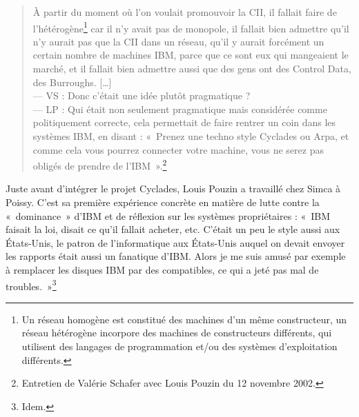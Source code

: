 \documentclass{FramateX}
\begin{document}
\begin{refsection}
\begin{quote}
À partir du moment où l'on voulait promouvoir la CII,
il fallait faire de l'hétérogène\footnote{Un réseau
homogène est constitué des machines d'un même
constructeur, un réseau hétérogène incorpore des machines de
constructeurs différents, qui utilisent des langages de programmation
et/ou des systèmes d'exploitation différents.} car il
n'y avait pas de monopole, il fallait bien admettre
qu'il n'y aurait pas que la CII dans
un réseau, qu'il y aurait forcément un certain nombre
de machines IBM, parce que ce sont eux qui mangeaient le marché, et il
fallait bien admettre aussi que des gens ont des Control Data, des Burroughs. [\ldots] \\
--- VS : Donc c'était une idée plutôt pragmatique ? \\
--- LP : Qui était non seulement pragmatique mais considérée comme politiquement correcte, cela permettait de faire rentrer un coin dans
les systèmes IBM, en disant : «~Prenez une techno style Cyclades ou Arpa, et comme cela vous pourrez connecter votre machine, vous ne serez pas obligés de prendre de
l'IBM~».\footnote{Entretien de Valérie Schafer avec
Louis Pouzin du 12 novembre 2002.}
\end{quote}

Juste avant d'intégrer le projet Cyclades, Louis Pouzin
a travaillé chez Simca à Poissy. C'est sa première
expérience concrète en matière de lutte contre la «~dominance~»
d'IBM et de réflexion sur les systèmes propriétaires :
«~IBM faisait la loi, disait ce qu'il fallait
acheter, etc. C'était un peu le style aussi aux
États-Unis, le patron de l'informatique aux États-Unis
auquel on devait envoyer les rapports était aussi un fanatique
d'IBM. Alors je me suis amusé par exemple à remplacer
les disques IBM par des compatibles, ce qui a jeté pas mal de
troubles.~»\footnote{Idem.}


\end{refsection}
\end{document}
